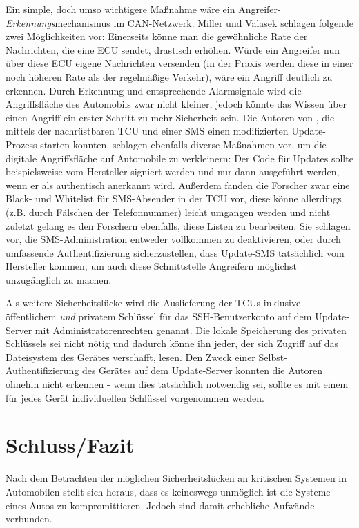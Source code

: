\documentclass[
    fontsize=12pt,
    headings=small,
    parskip=half,           %
    bibliography=totoc,9
    numbers=noenddot,       %
    open=any,               %
    ]{scrreprt}
\begin{document}
Ein simple, doch umso wichtigere Maßnahme wäre ein Angreifer-\textit{Erkennungs}mechanismus im CAN-Netzwerk. Miller und Valasek schlagen folgende zwei Möglichkeiten vor: Einerseits könne man die gewöhnliche Rate der Nachrichten, die eine ECU sendet, drastisch erhöhen. Würde ein Angreifer nun über diese ECU eigene Nachrichten versenden (in der Praxis werden diese in einer noch höheren Rate als der regelmäßige Verkehr), wäre ein Angriff deutlich zu erkennen. Durch Erkennung und entsprechende Alarmsignale wird die Angriffsfläche des Automobils zwar nicht kleiner, jedoch könnte das Wissen über einen Angriff ein erster Schritt zu mehr Sicherheit sein.
Die Autoren von \cite{FPK15}, die mittels der nachrüstbaren TCU und einer SMS einen modifizierten Update-Prozess starten konnten, schlagen ebenfalls diverse Maßnahmen vor, um die digitale Angriffsfläche auf Automobile zu verkleinern: Der Code für Updates sollte beispielsweise vom Hersteller signiert werden und nur dann ausgeführt werden, wenn er als authentisch anerkannt wird. Außerdem fanden die Forscher zwar eine Black- und Whitelist für SMS-Absender in der TCU vor, diese könne allerdings (z.B. durch Fälschen der Telefonnummer) leicht umgangen werden und nicht zuletzt gelang es den Forschern ebenfalls, diese Listen zu bearbeiten. Sie schlagen vor, die SMS-Administration entweder vollkommen zu deaktivieren, oder durch umfassende Authentifizierung sicherzustellen, dass Update-SMS tatsächlich vom Hersteller kommen, um auch diese Schnittstelle Angreifern möglichst unzugänglich zu machen.\par
Als weitere Sicherheitslücke wird die Auslieferung der TCUs inklusive öffentlichem \textit{und} privatem Schlüssel für das SSH-Benutzerkonto auf dem Update-Server mit Administratorenrechten genannt. Die lokale Speicherung des privaten Schlüssels sei nicht nötig und dadurch könne ihn jeder, der sich Zugriff auf das Dateisystem des Gerätes verschafft, lesen. Den Zweck einer Selbst-Authentifizierung des Gerätes auf dem Update-Server konnten die Autoren ohnehin nicht erkennen - wenn dies tatsächlich notwendig sei, sollte es mit einem für jedes Gerät individuellen Schlüssel vorgenommen werden.

\chapter{Schluss/Fazit}

Nach dem Betrachten der möglichen Sicherheitslücken an kritischen Systemen in Automobilen stellt sich heraus, dass es keineswegs unmöglich ist die Systeme eines Autos zu kompromittieren. Jedoch sind damit erhebliche Aufwände verbunden.
\end{document}
